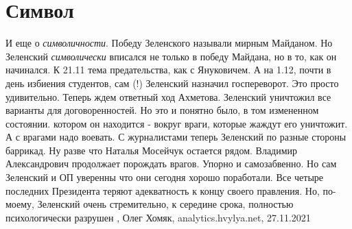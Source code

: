  
 
 
 
 
\chapter{Символ}

И еще о \emph{символичности}. Победу Зеленского называли мирным Майданом. Но Зеленский
\emph{символически} вписался не только в победу Майдана, но в то, как он начинался. К
21.11 тема предательства, как с Януковичем. А на 1.12, почти в день избиения
студентов, сам (!) Зеленский назначил госпереворот. Это просто удивительно.
Теперь ждем ответный ход Ахметова. Зеленский уничтожил все варианты для
договоренностей. Но это и понятно было, в том измененном состоянии. котором он
находится - вокруг враги, которые жаждут его уничтожит. А с врагами надо
воевать.  С журналистами теперь Зеленский по разные стороны баррикад. Ну разве
что Наталья Мосейчук остается рядом.  Владимир Александрович продолжает
порождать врагов. Упорно и самозабвенно.  Но сам Зеленский и ОП уверенны что
они сегодня хорошо поработали.  Все четыре последних Президента теряют
адекватность к концу своего правления.  Но, по-моему, Зеленский очень
стремительно, к середине срока, полностью психологически разрушен
, 
Олег Хомяк, analytics.hvylya.net, 27.11.2021
